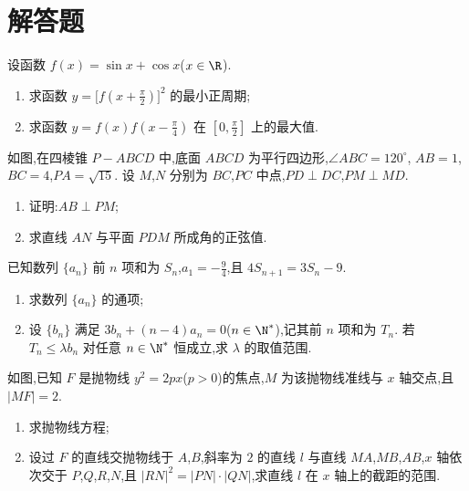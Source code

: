 \section{解答题}

\begin{problem}
设函数 \(f(x)=\sin x+\cos x\)(\(x\in\R\)).

\begin{enumerate}
\item 求函数 \(y=\bigl[f(x+\tfrac{\pi}{2})\bigr]^2\) 的最小正周期;

\item 求函数 \(y=f(x)f(x-\tfrac{\pi}{4})\) 在 \([0,\frac{\pi}{2}]\) 上的最大值.
\end{enumerate}
\end{problem}

\begin{problem}
如图,在四棱锥 \(P-ABCD\) 中,底面 \(ABCD\) 为平行四边形,\(\angle ABC=120^\circ\),
\(AB=1\),\(BC=4\),\(PA=\sqrt{15}\).
设 \(M\),\(N\) 分别为 \(BC\),\(PC\) 中点,\(PD\perp DC\),\(PM\perp MD\).

\begin{enumerate}
\item 证明:\(AB\perp PM\);

\item 求直线 \(AN\) 与平面 \(PDM\) 所成角的正弦值.
\end{enumerate}

\end{problem}

\begin{problem}
已知数列 \(\{a_n\}\) 前 \(n\) 项和为 \(S_n\),\(a_1=-\frac{9}{4}\),且
\(4S_{n+1}=3S_n-9\).

\begin{enumerate}
\item 求数列 \(\{a_n\}\) 的通项;

\item 设 \(\{b_n\}\) 满足
\(3b_n+(n-4)a_n=0\)(\(n\in\N^*\)),记其前 \(n\) 项和为 \(T_n\). 若
\(T_n\le\lambda b_n\) 对任意 \(n\in\N^*\) 恒成立,求 \(\lambda\) 的取值范围.
\end{enumerate}
\end{problem}

\begin{problem}
如图,已知 \(F\) 是抛物线 \(y^2=2px\)(\(p>0\))的焦点,\(M\) 为该抛物线准线与 \(x\) 轴交点,且 \(|MF|=2\).

\begin{enumerate}
\item 求抛物线方程;

\item 设过 \(F\) 的直线交抛物线于 \(A\),\(B\),斜率为 \(2\) 的直线 \(l\) 与直线 \(MA\),\(MB\),\(AB\),\(x\) 轴依次交于 \(P\),\(Q\),\(R\),\(N\),且 \(|RN|^2=|PN|\cdot|QN|\),求直线 \(l\) 在 \(x\) 轴上的截距的范围.
\end{enumerate}

\end{problem}

